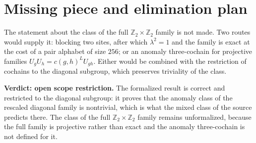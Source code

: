 \documentclass{article}
\begin{document}
\section{Missing piece and elimination plan}

The statement about the class of the full $\mathbb{Z}_2\times\mathbb{Z}_2$
family is not made. Two routes would supply it: blocking two sites, after
which $\lambda^2=1$ and the family is exact at the cost of a pair alphabet
of size $256$; or an anomaly three-cochain for projective families
$U_gU_h=c(g,h)^LU_{gh}$. Either would be combined with the restriction of
cochains to the diagonal subgroup, which preserves triviality of the class.

\textbf{Verdict: open scope restriction.} The formalized result is correct
and restricted to the diagonal subgroup: it proves that the anomaly class
of the rescaled diagonal family is nontrivial, which is what the mixed
class of the source predicts there. The class of the full
$\mathbb{Z}_2\times\mathbb{Z}_2$ family remains unformalized, because
the full family is projective rather than exact and the anomaly
three-cochain is not defined for it.



\end{document}
